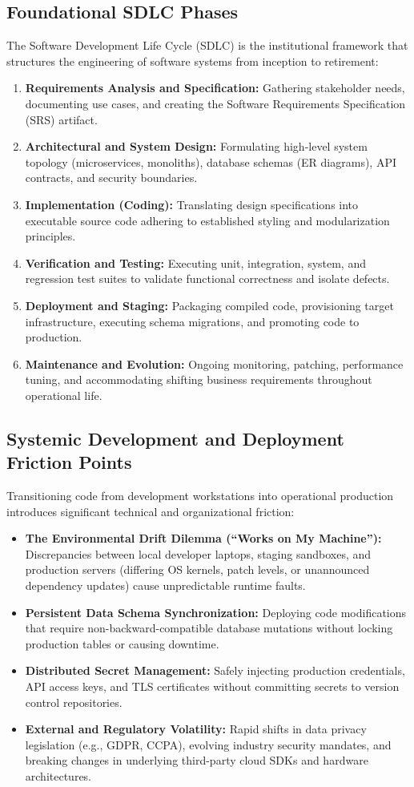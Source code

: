 \documentclass[11pt,a4paper]{article}
\begin{document}
\subsection{Foundational SDLC Phases}
The Software Development Life Cycle (SDLC) is the institutional framework that structures the engineering of software systems from inception to retirement:
\begin{enumerate}
    \item \textbf{Requirements Analysis and Specification:} Gathering stakeholder needs, documenting use cases, and creating the Software Requirements Specification (SRS) artifact.
    \item \textbf{Architectural and System Design:} Formulating high-level system topology (microservices, monoliths), database schemas (ER diagrams), API contracts, and security boundaries.
    \item \textbf{Implementation (Coding):} Translating design specifications into executable source code adhering to established styling and modularization principles.
    \item \textbf{Verification and Testing:} Executing unit, integration, system, and regression test suites to validate functional correctness and isolate defects.
    \item \textbf{Deployment and Staging:} Packaging compiled code, provisioning target infrastructure, executing schema migrations, and promoting code to production.
    \item \textbf{Maintenance and Evolution:} Ongoing monitoring, patching, performance tuning, and accommodating shifting business requirements throughout operational life.
\end{enumerate}

\subsection{Systemic Development and Deployment Friction Points}
Transitioning code from development workstations into operational production introduces significant technical and organizational friction:
\begin{itemize}
    \item \textbf{The Environmental Drift Dilemma (``Works on My Machine''):} Discrepancies between local developer laptops, staging sandboxes, and production servers (differing OS kernels, patch levels, or unannounced dependency updates) cause unpredictable runtime faults.
    \item \textbf{Persistent Data Schema Synchronization:} Deploying code modifications that require non-backward-compatible database mutations without locking production tables or causing downtime.
    \item \textbf{Distributed Secret Management:} Safely injecting production credentials, API access keys, and TLS certificates without committing secrets to version control repositories.
    \item \textbf{External and Regulatory Volatility:} Rapid shifts in data privacy legislation (e.g., GDPR, CCPA), evolving industry security mandates, and breaking changes in underlying third-party cloud SDKs and hardware architectures.
\end{itemize}
\end{document}
